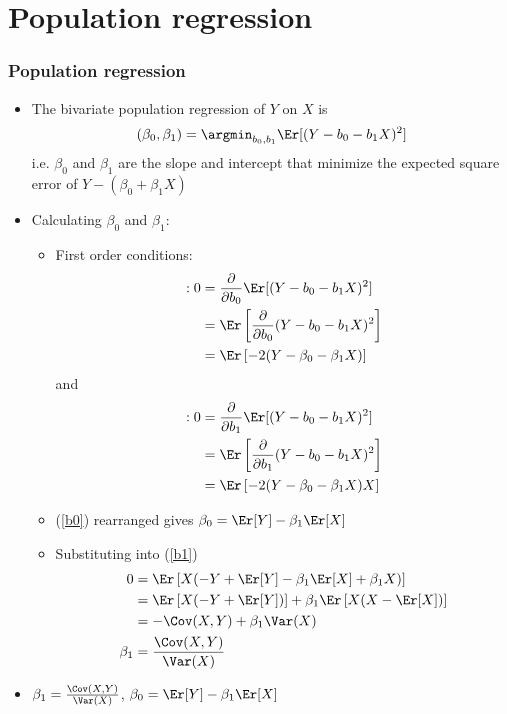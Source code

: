 \section{Population regression} 
\begin{frame}[allowframebreaks]\frametitle{Population regression}
  \begin{itemize}
  \item The bivariate \alert{population regression} of $Y$ on $X$ is 
    \[ (\beta_0, \beta_1) = \argmin_{b_0,b_1} \Er[(Y - b_0 - b_1
    X)^2 ] \] 
    i.e. $\beta_0$ and $\beta_1$ are the slope and intercept that
    minimize the expected square error of $Y - (\beta_0 + \beta_1 X)$ 
  \item Calculating $\beta_0$ and $\beta_1$:
    \begin{itemize}
    \item First order conditions:
      \begin{align}
        [b_0]: 0 & =  \frac{\partial}{\partial b_0} \Er[(Y - b_0 - b_1
        X)^2 ] \notag \\
         &=  \Er\left[\frac{\partial}{\partial b_0}  (Y - b_0 - b_1 X)^2 \right]
         \notag \\
        &=  \Er\left[ -2(Y - \beta_0 - \beta_1 X) \right] \label{b0}
      \end{align}
      and
      \begin{align}
        [b_1]:  0 &=  \frac{\partial}{\partial b_1} \Er[(Y - b_0 - b_1
        X)^2 ] \notag \\
         &=  \Er\left[\frac{\partial}{\partial b_1}  (Y - b_0 - b_1 X)^2 \right]
        \notag \\
        &=  \Er\left[ -2(Y - \beta_0 - \beta_1 X)X \right] \label{b1}
      \end{align}
    \item (\ref{b0}) rearranged gives $\beta_0 = \Er[Y] - \beta_1
      \Er[X]$
    \item Substituting into (\ref{b1})
      \begin{align*}
        0 &=  \Er\left[ X(-Y + \Er[Y] - \beta_1 \Er[X] + \beta_1 X) \right] \\
        &=  \Er\left[X(-Y + \Er[Y])\right] + \beta_1\Er\left[X(X -
          \Er[X])\right] \\
        &=  -\Cov(X,Y) + \beta_1 \Var(X) \\
        \beta_1 &=  \frac{\Cov(X,Y)}{\Var(X)}
      \end{align*}
    \end{itemize}
  \item \alert{$\beta_1 = \frac{\Cov(X,Y)}{\Var(X)}$, $\beta_0 = \Er[Y] - \beta_1
      \Er[X]$}
  \end{itemize}
\end{frame}


